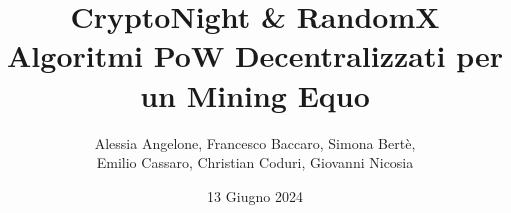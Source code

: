 \documentclass{report}[12pt]
\title{%
  \vspace{-2cm}
  \Huge \textbf{CryptoNight \& RandomX} \\
  \vspace{0.5cm}
  \LARGE Algoritmi PoW Decentralizzati per un Mining Equo \\
  \vspace{1cm}
}
\author{Alessia Angelone, Francesco Baccaro, Simona Bertè, \\ Emilio Cassaro, Christian Coduri, Giovanni Nicosia}
\date{13 Giugno 2024}
\begin{document}
\maketitle
\tableofcontents



 

\graphicspath{{./images/}}








\end{document}
